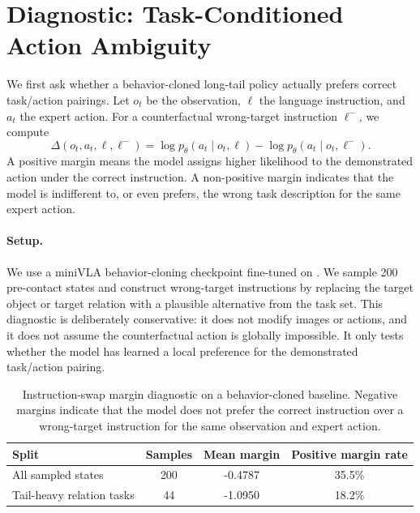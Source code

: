 \section{Diagnostic: Task-Conditioned Action Ambiguity}
\label{sec:diagnostic}

We first ask whether a behavior-cloned long-tail policy actually prefers correct task/action pairings. Let $o_t$ be the observation, $\ell$ the language instruction, and $a_t$ the expert action. For a counterfactual wrong-target instruction $\ell^{-}$, we compute
\begin{equation}
  \Delta(o_t, a_t, \ell, \ell^{-}) =
  \log p_\theta(a_t \mid o_t, \ell) -
  \log p_\theta(a_t \mid o_t, \ell^{-}).
\end{equation}
A positive margin means the model assigns higher likelihood to the demonstrated action under the correct instruction. A non-positive margin indicates that the model is indifferent to, or even prefers, the wrong task description for the same expert action.

\paragraph{Setup.}
We use a miniVLA behavior-cloning checkpoint fine-tuned on \liberocorelt{}. We sample 200 pre-contact states and construct wrong-target instructions by replacing the target object or target relation with a plausible alternative from the task set. This diagnostic is deliberately conservative: it does not modify images or actions, and it does not assume the counterfactual action is globally impossible. It only tests whether the model has learned a local preference for the demonstrated task/action pairing.

\begin{table}[t]
  \centering
  \caption{Instruction-swap margin diagnostic on a behavior-cloned \liberocorelt{} baseline. Negative margins indicate that the model does not prefer the correct instruction over a wrong-target instruction for the same observation and expert action.}
  \label{tab:diagnostic}
  \begin{tabular}{lccc}
    \toprule
    Split & Samples & Mean margin & Positive margin rate \\
    \midrule
    All sampled states & 200 & -0.4787 & 35.5\% \\
    Tail-heavy relation tasks & 44 & -1.0950 & 18.2\% \\
    \bottomrule
  \end{tabular}
\end{table}

